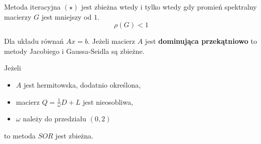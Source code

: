 \documentclass[../mn-notatki.tex]{subfiles}
\begin{document}
\begin{tcolorbox}
Metoda iteracyjna $(\star)$ jest zbieżna wtedy i tylko wtedy gdy promień
spektralny macierzy $G$ jest mniejszy od $1$.
\[
\rho(G) < 1
\]
\end{tcolorbox}

\begin{tcolorbox}
Dla układu równań $Ax = b$. Jeżeli macierz $A$ jest
\textbf{dominująca przekątniowo}
to metody Jacobiego i Gaussa-Seidla są zbieżne.
\end{tcolorbox}

\begin{tcolorbox}
Jeżeli
\begin{itemize}
    \item $A$ jest hermitowska, dodatnio określona,
    \item macierz $Q = \frac{1}{\omega} D + L$ jest nieosobliwa,
    \item $\omega$ należy do przedziału $(0,2)$
\end{itemize}
to metoda $SOR$ jest zbieżna.
\end{tcolorbox}

\pagebreak
\end{document}
